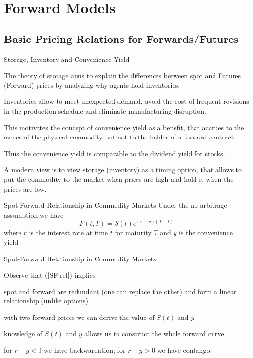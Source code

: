 \section{Forward Models}
\subsection{Basic Pricing Relations for Forwards/Futures}

{Storage, Inventory and Convenience Yield}


	The theory of storage aims to explain the differences between spot
and Futures (Forward) prices by analyzing why agents hold inventories.

	Inventories
allow to meet unexpected demand, avoid the cost of frequent revisions in
the production schedule and eliminate manufacturing disruption.

	This
motivates the concept of convenience yield as a benefit, that accrues to the
owner of the physical commodity but not to the holder of a forward contract.

	Thus the convenience yield is comparable to the dividend yield for stocks.

	A modern view is to view storage (inventory) as a timing option, that
allows to put the commodity to the market when prices are high
and hold it when the prices are low.


{Spot-Forward Relationship in Commodity Markets }
Under the no-arbitrage assumption we have
\begin{equation}\label{SF-rel}
F(t,T)=S(t)e^{(r-y)(T-t)}
\end{equation}
where $r$ is the interest rate at time $t$ for maturity $T$ and $y$ is the convenience yield.

{Spot-Forward Relationship in Commodity Markets }

Observe that (\ref{SF-rel}) implies


	spot and forward are redundant (one can replace the other) and form a
linear relationship (unlike options)

	with two forward prices we can derive the value of $S(t)$ and $y$

	knowledge of $S(t)$ and $y$ allows us to construct the whole forward curve

	for $r-y <0$ we have backwardation; for $r-y>0$ we have contango.

